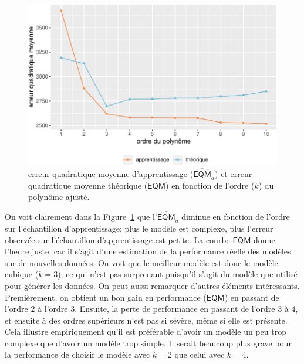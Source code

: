 \documentclass[
  11pt,
  letterpaper,
]{scrbook}
\theoremstyle{definition}
\theoremstyle{remark}
\begin{document}
\begin{figure}[ht!]

{\centering \includegraphics[width=1\textwidth,height=\textheight]{./04-selectionmodeles_files/figure-pdf/fig-plotEQMa-1.pdf}

}

\caption{\label{fig-plotEQMa}erreur quadratique moyenne d'apprentissage
(\(\widehat{\mathsf{EQM}}_a\)) et erreur quadratique moyenne théorique
(\(\mathsf{EQM}\)) en fonction de l'ordre (\(k\)) du polynôme ajusté.}

\end{figure}

On voit clairement dans la Figure~\ref{fig-plotEQMa} que
l'\(\widehat{\mathsf{EQM}}_a\) diminue en fonction de l'ordre sur
l'échantillon d'apprentissage: plus le modèle est complexe, plus
l'erreur observée sur l'échantillon d'apprentissage est petite. La
courbe \(\mathsf{EQM}\) donne l'heure juste, car il s'agit d'une
estimation de la performance réelle des modèles sur de nouvelles
données. On voit que le meilleur modèle est donc le modèle cubique
(\(k=3\)), ce qui n'est pas surprenant puisqu'il s'agit du modèle que
utilisé pour générer les données. On peut aussi remarquer d'autres
éléments intéressants. Premièrement, on obtient un bon gain en
performance (\(\mathsf{EQM}\)) en passant de l'ordre \(2\) à l'ordre
\(3\). Ensuite, la perte de performance en passant de l'ordre \(3\) à
\(4\), et ensuite à des ordres supérieurs n'est pas si sévère, même si
elle est présente. Cela illustre empiriquement qu'il est préférable
d'avoir un modèle un peu trop complexe que d'avoir un modèle trop
simple. Il serait beaucoup plus grave pour la performance de choisir le
modèle avec \(k=2\) que celui avec \(k=4\).
\end{document}
